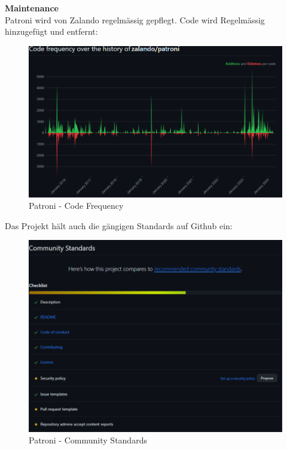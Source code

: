 \begin{flushleft}
    \textbf{Maintenance}\\
    Patroni wird von Zalando regelmässig gepflegt. Code wird Regelmässig hinzugefügt und entfernt:
    \begin{figure}[H]
        \centering
        \includegraphics[width=1\linewidth]{source/implementation/evaluation/postgresql_ha_solutions/insights/patroni/code_frequency_zalando_patroni}
        \caption{Patroni - Code Frequency}
        \label{fig:patroni-code-frequency}
    \end{figure}
    Das Projekt hält auch die gängigen Standards auf Github ein:
        \begin{figure}[H]
        \centering
        \includegraphics[width=1\linewidth]{source/implementation/evaluation/postgresql_ha_solutions/insights/patroni/community_Standards_zalando_patroni}
        \caption{Patroni - Community Standards}
        \label{fig:patroni-community-standards}
    \end{figure}
\end{flushleft}